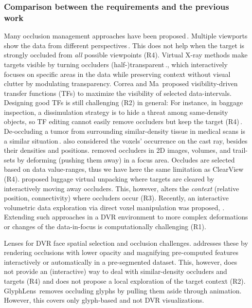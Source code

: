 \subsubsection{ Comparison between the requirements and the previous work }

Many occlusion management approaches have been proposed\,\cite{4483791}. Multiple viewports show the data from different perspectives\,\cite{WangBaldonado:2000:GUM:345513.345271}. This does not help when the target is strongly occluded from \emph{all} possible viewpoints (R4). Virtual X-ray methods make targets visible by turning occluders (half-)transparent\,\cite{Burns:2008:ACC:1457515.1409107}.\cite{4015450}, which interactively focuses on specific areas in the data while preserving context without visual clutter by modulating transparency. Correa and Ma\,\cite{5416704} proposed visibility-driven transfer functions (TFs) to maximize the visibility of selected data-intervals. Designing good TFs is still challenging (R2) in general: For instance, in baggage inspection, a dissimulation strategy is to hide a threat among same-density objects, so TF editing cannot easily remove occluders but keep the target (R4)\,\cite{7819413}. De-occluding a tumor from surrounding similar-density tissue in medical scans is a similar situation\,\cite{CGF:CGF12927}. 
\cite{CGF:CGF979} also considered the voxels' occurrence on the cast ray, besides their densities and positions.\cite{6787171} removed occluders in 2D images, volumes, and trail-sets by deforming (pushing them away) in a focus area. Occludes are selected based on data value-ranges, thus we have here the same limitation as ClearView (R4). \cite{Li:2012:LVV:2425296.2425325} proposed luggage virtual unpacking where targets are cleared by interactively moving away occluders. This, however, alters the \emph{context} (relative position, connectivity) where occluders occur (R3). Recently, an interactive volumetric data exploration via direct voxel manipulation was proposed, \cite{7819413}. Extending such approaches in a DVR environment to more complex deformations or changes of the data-in-focus is computationally challenging (R1).

Lenses for DVR face spatial selection and occlusion challenges. \cite{1532818} addresses these by rendering occlusions with lower opacity and magnifying pre-computed features interactively or automatically in a pre-segmented dataset. This, however, does not provide an (interactive) way to deal with similar-density occluders and targets (R4) and does not propose a local exploration of the target context (R2). GlyphLens\,\cite{7539643} removes occluding glyphs by pulling them aside through animation. However, this covers only glyph-based and not DVR visualizations. 

